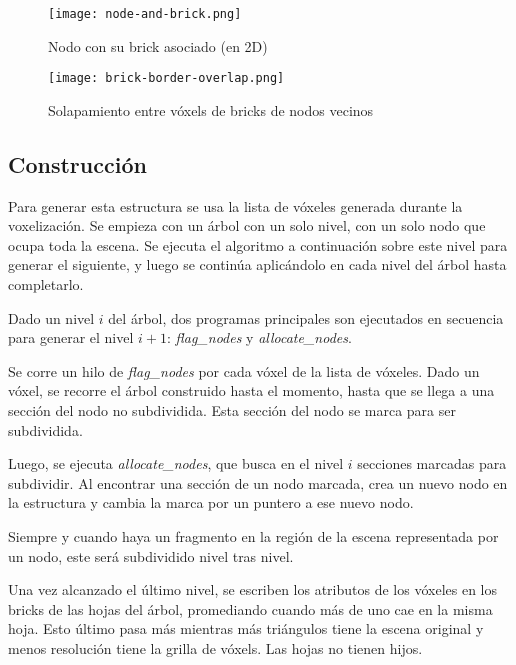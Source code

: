\begin{figure}[h!]
    \centering
    \texttt{[image: node-and-brick.png]}
    \caption{Nodo con su brick asociado (en 2D)}
    \label{fig:node_and_brick}
\end{figure}

\begin{figure}[h!]
    \centering
    \texttt{[image: brick-border-overlap.png]}
    \caption{Solapamiento entre vóxels de bricks de nodos vecinos}
    \label{fig:brick_border_overlap}
\end{figure}

\subsection{Construcción}\label{design:svo_construction}

Para generar esta estructura se usa la lista de vóxeles generada durante la voxelización.
Se empieza con un árbol con un solo nivel, con un solo nodo que ocupa toda la escena.
Se ejecuta el algoritmo a continuación sobre este nivel para generar el siguiente, y luego se continúa aplicándolo en cada nivel del árbol hasta completarlo.


Dado un nivel $i$ del árbol, dos programas principales son ejecutados en secuencia para generar el nivel $i + 1$: \textit{flag\_nodes} y \textit{allocate\_nodes}.

Se corre un hilo de \textit{flag\_nodes} por cada vóxel de la lista de vóxeles.
Dado un vóxel, se recorre el árbol construido hasta el momento, hasta que se llega a una sección del nodo no subdividida.
Esta sección del nodo se marca para ser subdividida.

Luego, se ejecuta \textit{allocate\_nodes}, que busca en el nivel $i$ secciones marcadas para subdividir.
Al encontrar una sección de un nodo marcada, crea un nuevo nodo en la estructura y cambia la marca por un puntero a ese nuevo nodo.

Siempre y cuando haya un fragmento en la región de la escena representada por un nodo, este será subdividido nivel tras nivel.

Una vez alcanzado el último nivel, se escriben los atributos de los vóxeles en los bricks de las hojas del árbol, promediando cuando más de uno cae en la misma hoja.
Esto último pasa más mientras más triángulos tiene la escena original y menos resolución tiene la grilla de vóxels.
Las hojas no tienen hijos.


